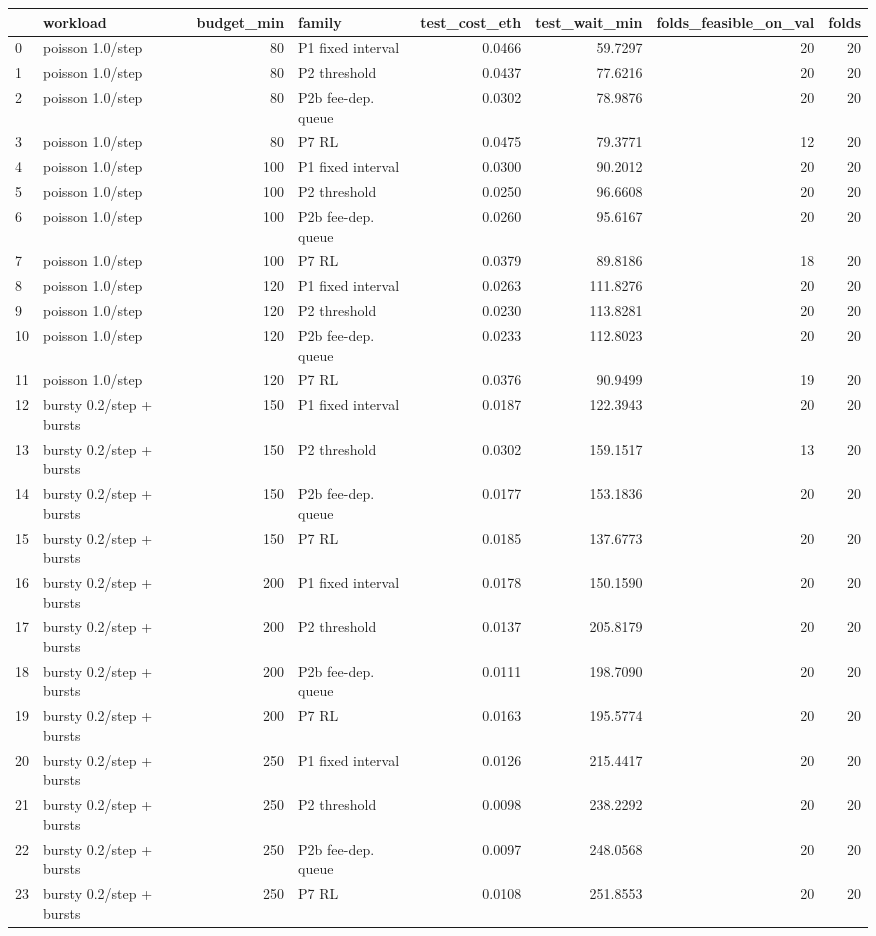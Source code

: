 \begin{tabular}{llrlrrrr}
\toprule
 & workload & budget_min & family & test_cost_eth & test_wait_min & folds_feasible_on_val & folds \\
\midrule
0 & poisson 1.0/step & 80 & P1 fixed interval & 0.0466 & 59.7297 & 20 & 20 \\
1 & poisson 1.0/step & 80 & P2 threshold & 0.0437 & 77.6216 & 20 & 20 \\
2 & poisson 1.0/step & 80 & P2b fee-dep. queue & 0.0302 & 78.9876 & 20 & 20 \\
3 & poisson 1.0/step & 80 & P7 RL & 0.0475 & 79.3771 & 12 & 20 \\
4 & poisson 1.0/step & 100 & P1 fixed interval & 0.0300 & 90.2012 & 20 & 20 \\
5 & poisson 1.0/step & 100 & P2 threshold & 0.0250 & 96.6608 & 20 & 20 \\
6 & poisson 1.0/step & 100 & P2b fee-dep. queue & 0.0260 & 95.6167 & 20 & 20 \\
7 & poisson 1.0/step & 100 & P7 RL & 0.0379 & 89.8186 & 18 & 20 \\
8 & poisson 1.0/step & 120 & P1 fixed interval & 0.0263 & 111.8276 & 20 & 20 \\
9 & poisson 1.0/step & 120 & P2 threshold & 0.0230 & 113.8281 & 20 & 20 \\
10 & poisson 1.0/step & 120 & P2b fee-dep. queue & 0.0233 & 112.8023 & 20 & 20 \\
11 & poisson 1.0/step & 120 & P7 RL & 0.0376 & 90.9499 & 19 & 20 \\
12 & bursty 0.2/step + bursts & 150 & P1 fixed interval & 0.0187 & 122.3943 & 20 & 20 \\
13 & bursty 0.2/step + bursts & 150 & P2 threshold & 0.0302 & 159.1517 & 13 & 20 \\
14 & bursty 0.2/step + bursts & 150 & P2b fee-dep. queue & 0.0177 & 153.1836 & 20 & 20 \\
15 & bursty 0.2/step + bursts & 150 & P7 RL & 0.0185 & 137.6773 & 20 & 20 \\
16 & bursty 0.2/step + bursts & 200 & P1 fixed interval & 0.0178 & 150.1590 & 20 & 20 \\
17 & bursty 0.2/step + bursts & 200 & P2 threshold & 0.0137 & 205.8179 & 20 & 20 \\
18 & bursty 0.2/step + bursts & 200 & P2b fee-dep. queue & 0.0111 & 198.7090 & 20 & 20 \\
19 & bursty 0.2/step + bursts & 200 & P7 RL & 0.0163 & 195.5774 & 20 & 20 \\
20 & bursty 0.2/step + bursts & 250 & P1 fixed interval & 0.0126 & 215.4417 & 20 & 20 \\
21 & bursty 0.2/step + bursts & 250 & P2 threshold & 0.0098 & 238.2292 & 20 & 20 \\
22 & bursty 0.2/step + bursts & 250 & P2b fee-dep. queue & 0.0097 & 248.0568 & 20 & 20 \\
23 & bursty 0.2/step + bursts & 250 & P7 RL & 0.0108 & 251.8553 & 20 & 20 \\
\bottomrule
\end{tabular}
